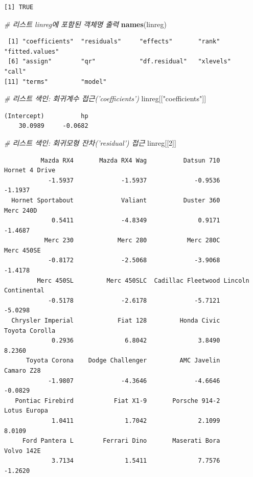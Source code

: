 \documentclass[11pt,a4paper]{book}
\newenvironment{Shaded}{\begin{snugshade}}{\end{snugshade}}
\newcommand{\KeywordTok}[1]{\textcolor[rgb]{0.13,0.29,0.53}{\textbf{#1}}}
\newcommand{\DecValTok}[1]{\textcolor[rgb]{0.00,0.00,0.81}{#1}}
\newcommand{\StringTok}[1]{\textcolor[rgb]{0.31,0.60,0.02}{#1}}
\newcommand{\CommentTok}[1]{\textcolor[rgb]{0.56,0.35,0.01}{\textit{#1}}}
\newcommand{\NormalTok}[1]{#1}
\theoremstyle{definition}
\theoremstyle{definition}
\theoremstyle{definition}
\theoremstyle{remark}
\begin{document}
\begin{verbatim}
[1] TRUE
\end{verbatim}

\begin{Shaded}
\begin{Highlighting}[]
\CommentTok{# 리스트 linreg에 포함된 객체명 출력}
\KeywordTok{names}\NormalTok{(linreg)}
\end{Highlighting}
\end{Shaded}

\begin{verbatim}
 [1] "coefficients"  "residuals"     "effects"       "rank"          "fitted.values"
 [6] "assign"        "qr"            "df.residual"   "xlevels"       "call"         
[11] "terms"         "model"        
\end{verbatim}

\begin{Shaded}
\begin{Highlighting}[]
\CommentTok{# 리스트 색인: 회귀계수 접근('coefficients')}
\NormalTok{linreg[[}\StringTok{"coefficients"}\NormalTok{]]}
\end{Highlighting}
\end{Shaded}

\begin{verbatim}
(Intercept)          hp 
    30.0989     -0.0682 
\end{verbatim}

\begin{Shaded}
\begin{Highlighting}[]
\CommentTok{# 리스트 색인: 회귀모형 잔차('residual') 접근}
\NormalTok{linreg[[}\DecValTok{2}\NormalTok{]]}
\end{Highlighting}
\end{Shaded}

\begin{verbatim}
          Mazda RX4       Mazda RX4 Wag          Datsun 710      Hornet 4 Drive 
            -1.5937             -1.5937             -0.9536             -1.1937 
  Hornet Sportabout             Valiant          Duster 360           Merc 240D 
             0.5411             -4.8349              0.9171             -1.4687 
           Merc 230            Merc 280           Merc 280C          Merc 450SE 
            -0.8172             -2.5068             -3.9068             -1.4178 
         Merc 450SL         Merc 450SLC  Cadillac Fleetwood Lincoln Continental 
            -0.5178             -2.6178             -5.7121             -5.0298 
  Chrysler Imperial            Fiat 128         Honda Civic      Toyota Corolla 
             0.2936              6.8042              3.8490              8.2360 
      Toyota Corona    Dodge Challenger         AMC Javelin          Camaro Z28 
            -1.9807             -4.3646             -4.6646             -0.0829 
   Pontiac Firebird           Fiat X1-9       Porsche 914-2        Lotus Europa 
             1.0411              1.7042              2.1099              8.0109 
     Ford Pantera L        Ferrari Dino       Maserati Bora          Volvo 142E 
             3.7134              1.5411              7.7576             -1.2620 
\end{verbatim}
\end{document}

